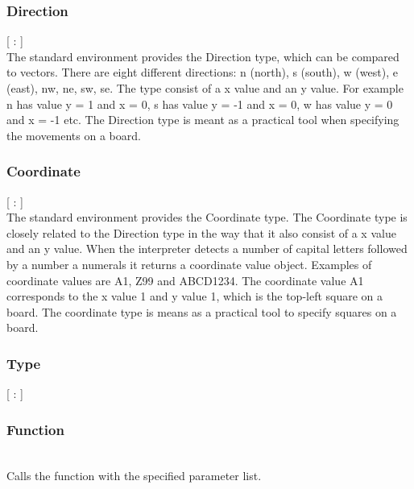 \subsubsection{Direction}
\begin{dlist}
  \item {}[ : ]\\
  The standard environment provides the Direction type, which can be compared to vectors. There are eight different directions: n (north), s (south), w (west), e (east), nw, ne, sw, se. The type consist of a x value and an y value. For example n has value y = 1 and x = 0, s has value y = -1 and x = 0, w has value y = 0 and x = -1 etc. The Direction type is meant as a practical tool when specifying the movements on a board.  
\end{dlist}

\subsubsection{Coordinate}
\begin{dlist}
  \item {}[ : ]\\
  The standard environment provides the Coordinate type. The Coordinate type is closely related to the Direction type in the way that it also consist of a x value and an y value. When the interpreter detects a number of capital letters followed by a number a numerals it returns a coordinate value object. Examples of coordinate values are A1, Z99 and ABCD1234. The coordinate value A1 corresponds to the x value 1 and y value 1, which is the top-left square on a board. The coordinate type is means as a practical tool to specify squares on a board.  
\end{dlist}
\subsubsection{Type}
  \item {}[ : ]\\
  
\subsubsection{Function}

\begin{dlist}
  \item {}\\
    Calls the function with the specified parameter list. 
\end{dlist}

